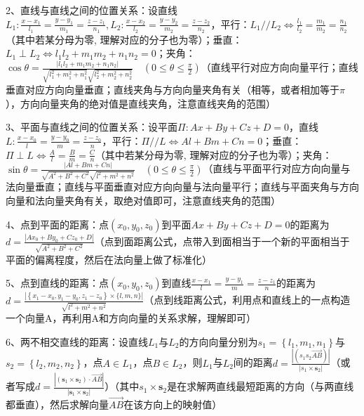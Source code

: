 2、直线与直线之间的位置关系：设直线$L_{1}: \frac{x-x_{1}}{l_{1}}=\frac{y-y_{1}}{m_{1}}=\frac{z-z_{1}}{n_{1}},L_{2}: \frac{x-x_{2}}{l_{2}}=\frac{y-y_{2}}{m_{2}}=\frac{z-z_{2}}{n_{2}}$，平行：$L_{1} / / L_{2} \Leftrightarrow \frac{l_{1}}{l_{2}}=\frac{m_{1}}{m_{2}}=\frac{n_{1}}{n_{2}}$（其中若某分母为零, 理解对应的分子也为零）；垂直：$L_{1} \perp L_{2} \Leftrightarrow l_{1} l_{2}+m_{1} m_{2}+n_{1} n_{2}=0$；夹角：$\cos \theta=\frac{\left|l_{1} l_{2}+m_{1} m_{2}+n_{1} n_{2}\right|}{\sqrt{l_{1}^{2}+m_{1}^{2}+n_{1}^{2}} \sqrt{l_{2}^{2}+m_{2}^{2}+n_{2}^{2}}} \quad\left(0 \leqslant \theta \leqslant \frac{\pi}{2}\right)$（直线平行对应方向向量平行；直线垂直对应方向向量垂直；直线夹角与方向向量夹角有关（相等，或者相加等于$\pi$），方向向量夹角的绝对值是直线夹角，注意直线夹角的范围）

3、平面与直线之间的位置关系：设平面$\Pi: A x+B y+C z+D=0$，直线$L: \frac{x-x_{0}}{l}=\frac{y-y_{0}}{m}=\frac{z-z_{0}}{n}$，平行：$\Pi / / L \Leftrightarrow A l+B m+C n=0$；垂直：$\Pi \perp L \Leftrightarrow \frac{A}{l}=\frac{B}{m}=\frac{C}{n}$（其中若某分母为零, 理解对应的分子也为零）；夹角：$\sin \theta=\frac{|A l+B m+C n|}{\sqrt{A^{2}+B^{2}+C^{2}} \sqrt{l^{2}+m^{2}+n^{2}}} \quad\left(0 \leqslant \theta \leqslant \frac{\pi}{2}\right)$（直线与平面平行对应方向向量与法向量垂直；直线与平面垂直对应方向向量与法向量平行；直线与平面夹角与方向向量和法向量夹角有关，取绝对值即可，注意直线夹角的范围）

4、点到平面的距离：点$\left(x_{0}, y_{0}, z_{0}\right)$到平面$A x+B y+C z+D=0$的距离为$d=\frac{\left|A x_{0}+B y_{0}+C z_{0}+D\right|}{\sqrt{A^{2}+B^{2}+C^{2}}}$（点到面距离公式，点带入到面相当于一个新的平面相当于平面的偏离程度，然后在法向量上做了标准化）

5、点到直线的距离：点$\left(x_{0}, y_{0}, z_{0}\right)$到直线$\frac{x-x_{1}}{l}=\frac{y-y_{1}}{m}=\frac{z-z_{1}}{n}$的距离为$d=\frac{\left|\left\{x_{1}-x_{0}, y_{1}-y_{0}, z_{1}-z_{0}\right\} \times\{l, m, n\}\right|}{\sqrt{l^{2}+m^{2}+n^{2}}}$（点到线距离公式，利用点和直线上的一点构造一个向量A，再利用A和方向向量的关系求解，理解即可）

6、两不相交直线的距离：设直线$L_{1}$与$L_{2}$的方向向量分别为$s_{1}=\left\{l_{1}, m_{1}, n_{1}\right\}$与$s_{2}=\left\{l_{2}, m_{2}, n_{2}\right\}$，点$A \in L_{1}$，点$B \in L_{2}$，则$L_{1}$与$L_{2}$间的距离$d=\frac{\left|\left(s_{1} s_{2} \overrightarrow{A B}\right)\right|}{\left|s_{1} \times \boldsymbol{s}_{2}\right|}$（或者写成$d=\frac{\left|\left(\boldsymbol{s}_{1} \times \boldsymbol{s}_{2}\right) \cdot \overrightarrow{A B}\right|}{\left|\boldsymbol{s}_{1} \times \boldsymbol{s}_{2}\right|}$）（其中$s_{1} \times \boldsymbol{s}_{2}$是在求解两直线最短距离的方向（与两直线都垂直），然后求解向量$\overrightarrow{A B}$在该方向上的映射值）


